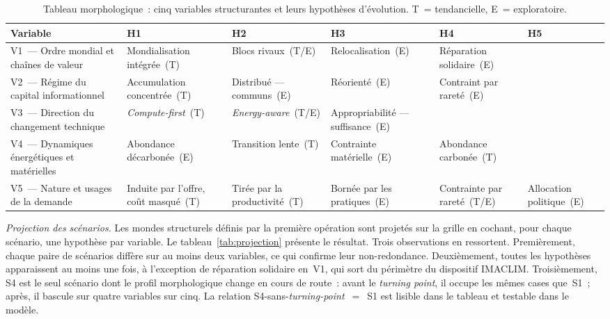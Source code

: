\begin{table}[htbp]
\centering
\small
\caption{Tableau morphologique~: cinq variables structurantes et leurs hypoth\`eses d'\'evolution. T~= tendancielle, E~= exploratoire.}\label{tab:morpho}
\begin{tabular}{p{3.8cm}p{2.2cm}p{2.2cm}p{2.2cm}p{2.2cm}p{2.2cm}}
\hline
\textbf{Variable} & \textbf{H1} & \textbf{H2} & \textbf{H3} & \textbf{H4} & \textbf{H5} \\
\hline
V1~--- Ordre mondial et cha\^ines de valeur &
Mondialisation int\'egr\'ee~(T) &
Blocs rivaux~(T/E) &
Relocalisation~(E) &
R\'eparation solidaire~(E) & \\
\hline
V2~--- R\'egime du capital informationnel &
Accumulation concentr\'ee~(T) &
Distribu\'e --- communs~(E) &
R\'eorient\'e~(E) &
Contraint par raret\'e~(E) & \\
\hline
V3~--- Direction du changement technique &
\emph{Compute-first}~(T) &
\emph{Energy-aware}~(T/E) &
Appropriabilit\'e --- suffisance~(E) & & \\
\hline
V4~--- Dynamiques \'energ\'etiques et mat\'erielles &
Abondance d\'ecarbon\'ee~(E) &
Transition lente~(T) &
Contrainte mat\'erielle~(E) &
Abondance carbon\'ee~(T) & \\
\hline
V5~--- Nature et usages de la demande &
Induite par l'offre, co\^ut masqu\'e~(T) &
Tir\'ee par la productivit\'e~(T) &
Born\'ee par les pratiques~(E) &
Contrainte par raret\'e~(T/E) &
Allocation politique~(E) \\
\hline
\end{tabular}
\end{table}

\emph{Projection des sc\'enarios.} Les mondes structurels d\'efinis par la premi\`ere op\'eration sont projet\'es sur la grille en cochant, pour chaque sc\'enario, une hypoth\`ese par variable. Le tableau~\ref{tab:projection} pr\'esente le r\'esultat. Trois observations en ressortent. Premi\`erement, chaque paire de sc\'enarios diff\`ere sur au moins deux variables, ce qui confirme leur non-redondance. Deuxi\`emement, toutes les hypoth\`eses apparaissent au moins une fois, \`a l'exception de \og r\'eparation solidaire\fg{} en~V1, qui sort du p\'erim\`etre du dispositif IMACLIM. Troisi\`emement, S4 est le seul sc\'enario dont le profil morphologique change en cours de route~: avant le \emph{turning point}, il occupe les m\^emes cases que~S1~; apr\`es, il bascule sur quatre variables sur cinq. La relation S4-sans-\emph{turning-point}~$=$~S1 est lisible dans le tableau et testable dans le mod\`ele.

